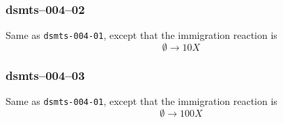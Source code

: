 
\subsubsection{dsmts--004--02} 

Same as \verb$dsmts-004-01$, except that the immigration reaction is 
\[
\emptyset \longrightarrow 10 X
\] 


\subsubsection{dsmts--004--03} 

Same as \verb$dsmts-004-01$, except that the immigration reaction is 
\[
\emptyset \longrightarrow 100 X
\] 



